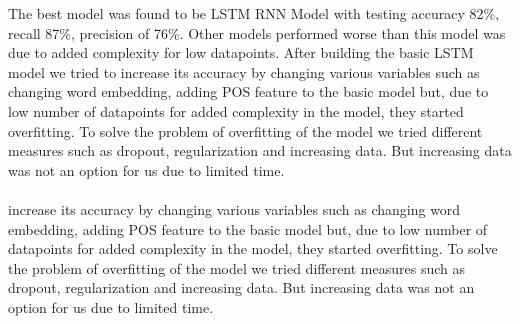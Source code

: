 	The best model was found to be LSTM RNN Model with testing accuracy 82\%, recall 87\%, precision of 76\%. Other models performed worse than this model was due to added complexity for low datapoints. After building the basic LSTM model we tried to 
	increase its accuracy by changing various variables such as changing word embedding, adding POS feature to the basic model but, due to low number of datapoints for added complexity in the model, they started overfitting. To solve the problem of overfitting of the model we tried different measures such as dropout, regularization and increasing data. But increasing data was not an option for us due to limited time.\\\\
	increase its accuracy by changing various variables such as changing word embedding, adding POS feature to the basic model but, due to low number of datapoints for added complexity in the model, they started overfitting. To solve the problem of overfitting of the model we tried different measures such as dropout, regularization and increasing data. But increasing data was not an option for us due to limited time.